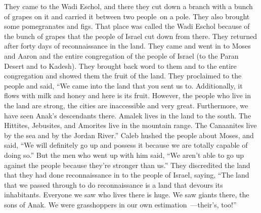 \begin{inparaenum}
   They came to the Wadi Eschol, and there they cut down a branch with a bunch of grapes on it and carried it between two people\understood\ on a pole. They also brought some pomegranates and figs.%
   That place was called the Wadi Eschol because of the bunch of grapes that the people of Israel cut down from there.%
   They returned after forty days of reconnaissance in the land.%
   They came and went in to Moses and Aaron and the entire congregation of the people of Israel (to the Paran Desert and to Kadesh). They brought back word to them and to the entire congregation and showed them the fruit of the land.%
   They proclaimed to the people and said, ``We came into the land that you sent us to. Additionally, it flows with milk and honey and here is its fruit.%
   However, the people who live in the land are strong, the cities are inaccessible and very great. Furthermore, we have seen Anak's descendants there.%
   Amalek lives in the land to the south. The Hittites, Jebusites, and Amorites live in the mountain range. The Canaanites live by the sea and by the Jordan River.''\understood%
   Caleb hushed the people about Moses, and said, ``We will definitely go up and possess it because we are totally capable of doing so.''%
   But the men who went up with him said, ``We aren't able to go up against the people because they're stronger than us.''%
   They discredited the land that they had done reconnaissance in to the people of Israel, saying, ``The land that we passed through to do reconnaissance is a land that devours its inhabitants. Everyone we saw who lives there is huge.%
   We saw giants there, the sons of Anak. We were grasshoppers in our own estimation~---their's, too!''%
\end{inparaenum}
